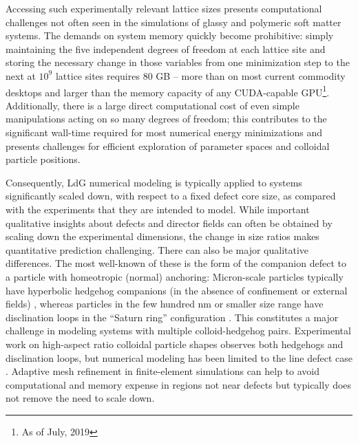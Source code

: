\documentclass[utf8]{frontiersFPHY} %
\begin{document}
Accessing such experimentally relevant lattice sizes presents computational challenges not often seen in the simulations of glassy and polymeric soft matter systems. The demands on system memory quickly become prohibitive: simply maintaining the five independent degrees of freedom at each lattice site and storing the necessary change in those variables from one minimization step to the next at $10^9$ lattice sites requires 80 GB -- more than on most current commodity desktops and larger than the memory capacity of any CUDA-capable GPU\footnote{As of July, 2019}. Additionally, there is a large  direct computational cost of even simple manipulations acting on so many degrees of freedom; this contributes to the significant wall-time required for most numerical energy minimizations and presents challenges for efficient exploration of parameter spaces and colloidal particle positions.

Consequently, LdG numerical modeling is typically applied to systems significantly scaled down, with respect to a fixed defect core size, as compared with the experiments that they are intended to model.   While important qualitative insights about defects and director fields can often be obtained by scaling down the experimental dimensions, the change in size ratios makes quantitative prediction challenging. There can also be major qualitative differences. The most well-known of these is the form of the companion defect to a  particle with homeotropic (normal) anchoring: Micron-scale particles typically have hyperbolic hedgehog companions (in the absence of confinement or external fields) \citep{poulin1997novel}, whereas particles in the few hundred nm or smaller size range have disclination loops in the ``Saturn ring'' configuration \citep{terentjev1995disclination,Stark2001}. This constitutes a major challenge in modeling systems with multiple colloid-hedgehog pairs. Experimental work on high-aspect ratio colloidal particle shapes observes both hedgehogs and disclination loops, but numerical modeling has been limited to the line defect case \cite{tkalec2008interactions,gharbi2013microbulletPublished,luo2019deck,luo2019deck,hung2006anisotropic,hung2009faceted,HungPRE2009,tasinkevych2014dispersions,beller2015shape,hashemi2015equilibrium}.   Adaptive mesh refinement  in finite-element simulations can help to avoid computational and memory expense in regions not near defects \citep{bajc2016mesh} but typically does not remove the need to scale down. 
\end{document}
